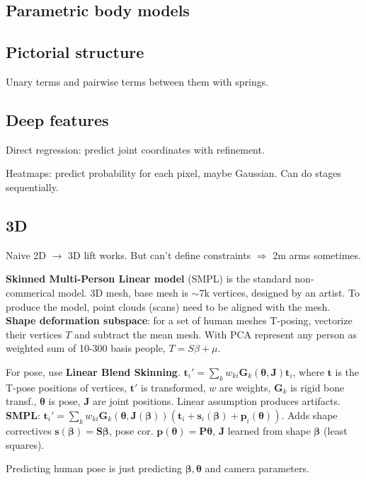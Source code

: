 \documentclass[11pt,landscape,a4paper,fleqn]{article}
\def\myvector#1{\mathbf{#1}}
\def\vp{{\myvector{p}}}
\def\vs{{\myvector{s}}}
\def\vt{{\myvector{t}}}
\def\mymatrix#1{\mathbf{#1}}
\def\mG{{\mymatrix{G}}}
\def\mJ{{\mymatrix{J}}}
\def\mP{{\mymatrix{P}}}
\def\mS{{\mymatrix{S}}}
\begin{document}
\begin{multicols*}{4}
\section{Parametric body models}

\subsection{Pictorial structure}

Unary terms and pairwise terms between them with springs.

\subsection{Deep features}

Direct regression: predict joint coordinates with refinement.

Heatmaps: predict probability for each pixel, maybe Gaussian.
Can do stages sequentially.

\subsection{3D}

Naive 2D $\to$ 3D lift works.
But can't define constraints $ \Rightarrow $ 2m arms sometimes.

\textbf{Skinned Multi-Person Linear model} (SMPL) is the standard non-commerical model.
3D mesh, base mesh is $\sim$7k vertices, designed by an artist.
To produce the model, point clouds (scans) need to be aligned with the mesh.
\textbf{Shape deformation subspace}: for a set of human meshes T-posing,
vectorize their vertices $T$ and subtract the mean mesh.
With PCA represent any person as weighted sum of 10-300 basis people, $T = S\beta + \mu$.

For pose, use \textbf{Linear Blend Skinning}.
$\vt_i' = \sum_k w_{ki} \mG_k(\bm\theta, \mJ)\vt_i$,
where $\vt$ is the T-pose positions of vertices,
$\vt'$ is transformed, $w$ are weights,
$\mG_k$ is rigid bone transf.,
$\bm\theta$ is pose, $\mJ$ are joint positions.
Linear assumption produces artifacts.
\textbf{SMPL}:
$\vt_i' = \sum_k w_{ki} \mG_k(\bm\theta, \mJ(\bm\beta))(\vt_i + \vs_i(\bm\beta) + \vp_i(\bm\theta))$.
Adds shape correctives $\vs(\bm\beta) = \mS\bm\beta$,
pose cor. $\vp(\bm\theta) = \mP\bm\theta$,
$\mJ$ learned from shape $\bm\beta$ (least squares).

Predicting human pose is just predicting $\bm\beta, \bm\theta$ and camera parameters.


\end{multicols*}
\end{document}
